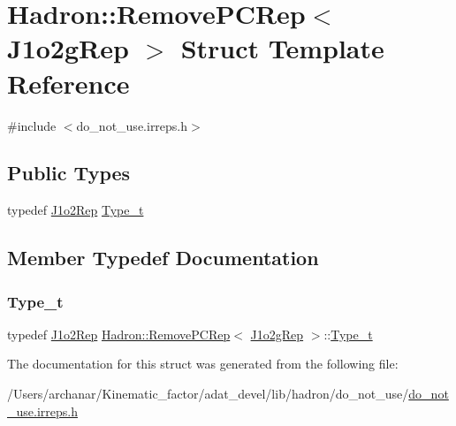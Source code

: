 \hypertarget{structHadron_1_1RemovePCRep_3_01J1o2gRep_01_4}{}\section{Hadron\+:\+:Remove\+P\+C\+Rep$<$ J1o2g\+Rep $>$ Struct Template Reference}
\label{structHadron_1_1RemovePCRep_3_01J1o2gRep_01_4}


{\ttfamily \#include $<$do\+\_\+not\+\_\+use.\+irreps.\+h$>$}

\subsection*{Public Types}
\begin{DoxyCompactItemize}
\item 
typedef \mbox{\hyperlink{structHadron_1_1J1o2Rep}{J1o2\+Rep}} \mbox{\hyperlink{structHadron_1_1RemovePCRep_3_01J1o2gRep_01_4_a67f5c615c77485f1e07838b2ef1e6317}{Type\+\_\+t}}
\end{DoxyCompactItemize}


\subsection{Member Typedef Documentation}
\mbox{\label{structHadron_1_1RemovePCRep_3_01J1o2gRep_01_4_a67f5c615c77485f1e07838b2ef1e6317}} 
\subsubsection{\texorpdfstring{Type\_t}{Type\_t}}
{\footnotesize\ttfamily typedef \mbox{\hyperlink{structHadron_1_1J1o2Rep}{J1o2\+Rep}} \mbox{\hyperlink{structHadron_1_1RemovePCRep}{Hadron\+::\+Remove\+P\+C\+Rep}}$<$ \mbox{\hyperlink{structHadron_1_1J1o2gRep}{J1o2g\+Rep}} $>$\+::\mbox{\hyperlink{structHadron_1_1RemovePCRep_3_01J1o2gRep_01_4_a67f5c615c77485f1e07838b2ef1e6317}{Type\+\_\+t}}}



The documentation for this struct was generated from the following file\+:\begin{DoxyCompactItemize}
\item 
/\+Users/archanar/\+Kinematic\+\_\+factor/adat\+\_\+devel/lib/hadron/do\+\_\+not\+\_\+use/\mbox{\hyperlink{do__not__use_8irreps_8h}{do\+\_\+not\+\_\+use.\+irreps.\+h}}\end{DoxyCompactItemize}
